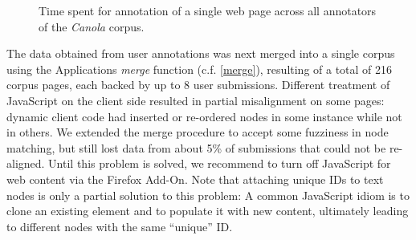 \begin{figure}[h]
\centering
{}
\label{f:userstats}
\caption{Time spent for annotation of a single web page across all annotators of the \textit{Canola} corpus.}
\end{figure}

The data obtained from user annotations was next merged into a single corpus using the Applications \textit{merge} function (c.f. \ref{merge}), resulting of a total of 216 corpus pages, each backed by up to 8 user submissions.
Different treatment of JavaScript on the client side resulted in partial misalignment on some pages:
dynamic client code had inserted or re-ordered nodes in some instance while not in others.
We extended the merge procedure to accept some fuzziness in node matching, but still lost data from about 5\% of submissions that could not be re-aligned.
Until this problem is solved, we recommend to turn off JavaScript for web content via the Firefox Add-On.
Note that attaching unique IDs to text nodes is only a partial solution to this problem:
A common JavaScript idiom is to clone an existing element and to populate it with new content, ultimately leading to different nodes with the same ``unique'' ID. 

